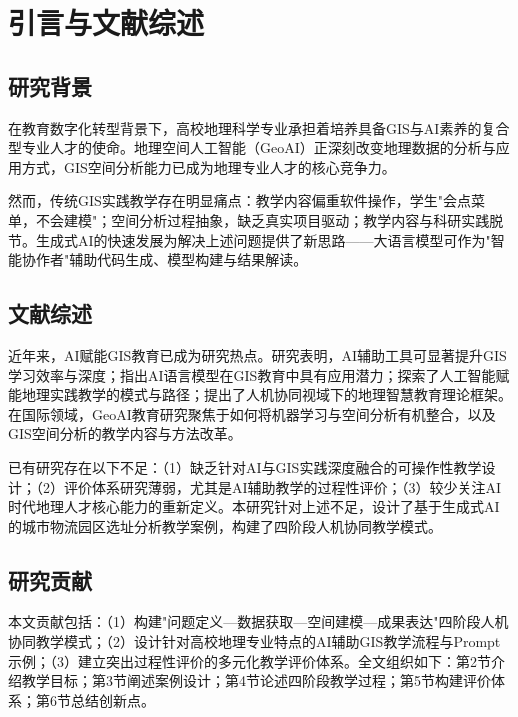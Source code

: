 \section{引言与文献综述}

\subsection{研究背景}

在教育数字化转型背景下，高校地理科学专业承担着培养具备GIS与AI素养的复合型专业人才的使命。地理空间人工智能（GeoAI）正深刻改变地理数据的分析与应用方式\citep{Jiang2023GeoAI}，GIS空间分析能力已成为地理专业人才的核心竞争力。

然而，传统GIS实践教学存在明显痛点：教学内容偏重软件操作，学生"会点菜单，不会建模"\citep{杜清运2017}；空间分析过程抽象，缺乏真实项目驱动；教学内容与科研实践脱节\citep{王民2018}。生成式AI的快速发展为解决上述问题提供了新思路——大语言模型可作为"智能协作者"辅助代码生成、模型构建与结果解读\citep{Dwivedi2023}。

\subsection{文献综述}

近年来，AI赋能GIS教育已成为研究热点。\citet{Zhang2023AI}研究表明，AI辅助工具可显著提升GIS学习效率与深度；\citet{Wang2020}指出AI语言模型在GIS教育中具有应用潜力；\citet{Zhao2021}探索了人工智能赋能地理实践教学的模式与路径；\citet{Luo2022}提出了人机协同视域下的地理智慧教育理论框架。在国际领域，GeoAI教育研究聚焦于如何将机器学习与空间分析有机整合\citep{Klosterman2015}，以及GIS空间分析的教学内容与方法改革\citep{杜清运2017}。

已有研究存在以下不足：（1）缺乏针对AI与GIS实践深度融合的可操作性教学设计；（2）评价体系研究薄弱，尤其是AI辅助教学的过程性评价；（3）较少关注AI时代地理人才核心能力的重新定义。本研究针对上述不足，设计了基于生成式AI的城市物流园区选址分析教学案例，构建了四阶段人机协同教学模式。

\subsection{研究贡献}

本文贡献包括：（1）构建"问题定义—数据获取—空间建模—成果表达"四阶段人机协同教学模式；（2）设计针对高校地理专业特点的AI辅助GIS教学流程与Prompt示例；（3）建立突出过程性评价的多元化教学评价体系。全文组织如下：第2节介绍教学目标；第3节阐述案例设计；第4节论述四阶段教学过程；第5节构建评价体系；第6节总结创新点。